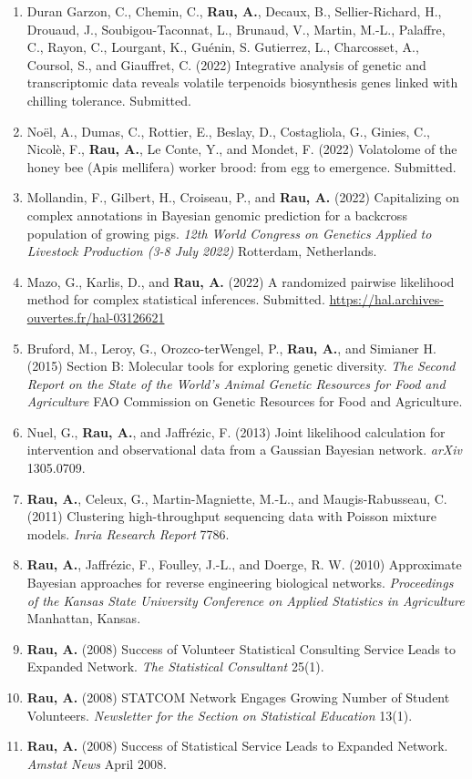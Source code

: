\documentclass[11pt, a4paper]{awesome-cv}
\providecommand{\tightlist}{%
	\setlength{\itemsep}{0pt}\setlength{\parskip}{0pt}}
\begin{document}
\begin{enumerate}
\def\labelenumi{\arabic{enumi}.}
\tightlist
\item
  Duran Garzon, C., Chemin, C., \textbf{Rau, A.}, Decaux, B.,
  Sellier-Richard, H., Drouaud, J., Soubigou-Taconnat, L., Brunaud, V.,
  Martin, M.-L., Palaffre, C., Rayon, C., Lourgant, K., Guénin, S.
  Gutierrez, L., Charcosset, A., Coursol, S., and Giauffret, C. (2022)
  Integrative analysis of genetic and transcriptomic data reveals
  volatile terpenoids biosynthesis genes linked with chilling tolerance.
  Submitted.
\item
  Noël, A., Dumas, C., Rottier, E., Beslay, D., Costagliola, G., Ginies,
  C., Nicolè, F., \textbf{Rau, A.}, Le Conte, Y., and Mondet, F. (2022)
  Volatolome of the honey bee (Apis mellifera) worker brood: from egg to
  emergence. Submitted.
\item
  Mollandin, F., Gilbert, H., Croiseau, P., and \textbf{Rau, A.} (2022)
  Capitalizing on complex annotations in Bayesian genomic prediction for
  a backcross population of growing pigs. \emph{12th World Congress on
  Genetics Applied to Livestock Production (3-8 July 2022)} Rotterdam,
  Netherlands.
\item
  Mazo, G., Karlis, D., and \textbf{Rau, A.} (2022) A randomized
  pairwise likelihood method for complex statistical inferences.
  Submitted. \url{https://hal.archives-ouvertes.fr/hal-03126621}
\item
  Bruford, M., Leroy, G., Orozco-terWengel, P., \textbf{Rau, A.}, and
  Simianer H. (2015) Section B: Molecular tools for exploring genetic
  diversity. \emph{The Second Report on the State of the World's Animal
  Genetic Resources for Food and Agriculture} FAO Commission on Genetic
  Resources for Food and Agriculture.
\item
  Nuel, G., \textbf{Rau, A.}, and Jaffrézic, F. (2013) Joint likelihood
  calculation for intervention and observational data from a Gaussian
  Bayesian network. \emph{arXiv} 1305.0709.
\item
  \textbf{Rau, A.}, Celeux, G., Martin-Magniette, M.-L., and
  Maugis-Rabusseau, C. (2011) Clustering high-throughput sequencing data
  with Poisson mixture models. \emph{Inria Research Report} 7786.
\item
  \textbf{Rau, A.}, Jaffrézic, F., Foulley, J.-L., and Doerge, R. W.
  (2010) Approximate Bayesian approaches for reverse engineering
  biological networks. \emph{Proceedings of the Kansas State University
  Conference on Applied Statistics in Agriculture} Manhattan, Kansas.
\item
  \textbf{Rau, A.} (2008) Success of Volunteer Statistical Consulting
  Service Leads to Expanded Network. \emph{The Statistical Consultant}
  25(1).
\item
  \textbf{Rau, A.} (2008) STATCOM Network Engages Growing Number of
  Student Volunteers. \emph{Newsletter for the Section on Statistical
  Education} 13(1).
\item
  \textbf{Rau, A.} (2008) Success of Statistical Service Leads to
  Expanded Network. \emph{Amstat News} April 2008.
\end{enumerate}
\end{document}
